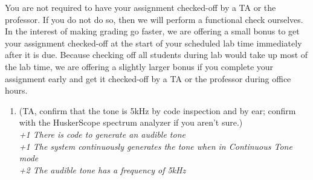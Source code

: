 You are not required to have your assignment checked-off by a TA or the professor.
If you do not do so, then we will perform a functional check ourselves.
In the interest of making grading go faster, we are offering a small bonus to get your assignment checked-off at the start of your scheduled lab time immediately after it is due.
Because checking off all students during lab would take up most of the lab time, we are offering a slightly larger bonus if you complete your assignment early and get it checked-off by a TA or the professor during office hours.

\begin{enumerate}

    \item[] (TA, confirm that the tone is 5kHz by code inspection and by ear; confirm with the HuskerScope spectrum analyzer if you aren't sure.) \\
        \textit{+1 There is code to generate an audible tone} \\
        \textit{+1 The system continuously generates the tone when in Continuous Tone mode} \\
        \textit{+2 The audible tone has a frequency of 5kHz}


\end{enumerate}
